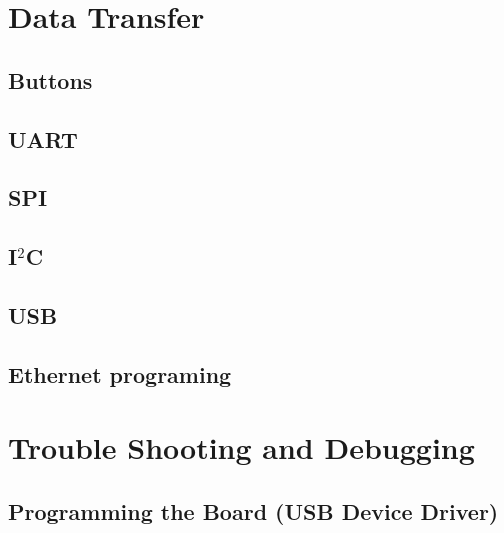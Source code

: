 \documentclass[]{book}
\begin{document}
%

%
\chapter{Data Transfer}
\section{Buttons}
\section{UART}
\section{SPI}
\section{I$^2$C}
\section{USB}
\section{Ethernet programing}

\chapter{Trouble Shooting and Debugging}
\section{Programming the Board (USB Device Driver)}
\end{document}
